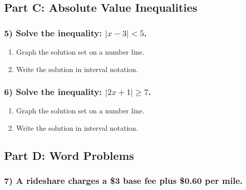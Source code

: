 \documentclass[12pt]{article}
\begin{document}
                \vspace{0.5cm}

                \newpage
        
        \subsection*{Part C: Absolute Value Inequalities}
            
            \subsubsection*{5) Solve the inequality: $|x - 3| < 5$.}

                \begin{enumerate}
                    \item[(a)] Graph the solution set on a number line.
                    \item[(b)] Write the solution in interval notation.
                \end{enumerate}
                
                \vspace{0.5cm}

            \subsubsection*{6) Solve the inequality: $|2x + 1| \geq 7$.}

                \begin{enumerate}
                    \item[(a)] Graph the solution set on a number line.
                    \item[(b)] Write the solution in interval notation.
                \end{enumerate}
                
                \vspace{0.5cm}
        
        \subsection*{Part D: Word Problems}
        
            \subsubsection*{7) A rideshare charges a \$3 base fee plus \$0.60 per mile.}
            
\end{document}
